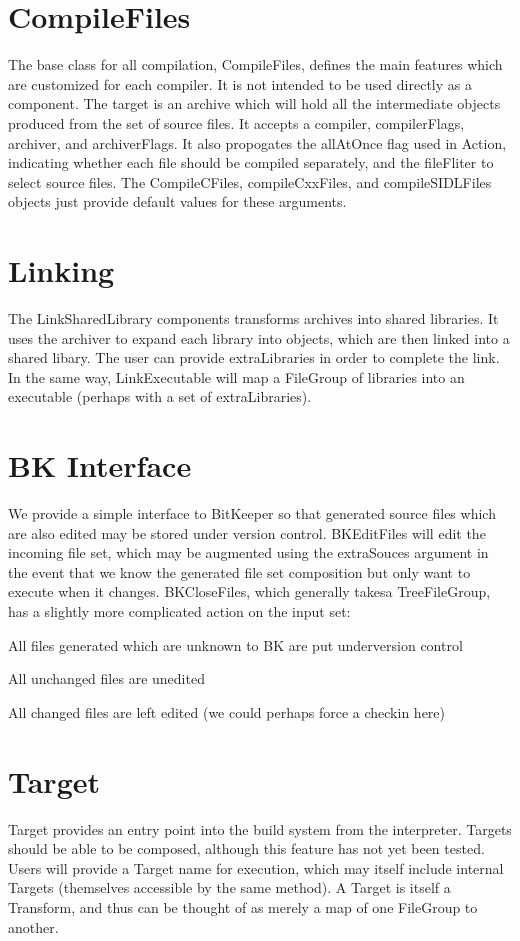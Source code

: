 \section{CompileFiles}

The base class for all compilation, CompileFiles, defines the main features which are customized for each compiler. It
is not intended to be used directly as a component. The target is an archive which will hold all the intermediate
objects produced from the set of source files. It accepts a compiler, compilerFlags, archiver, and archiverFlags. It
also propogates the allAtOnce flag used in Action, indicating whether each file should be compiled separately, and the
fileFliter to select source files. The CompileCFiles, compileCxxFiles, and compileSIDLFiles objects just provide default
values for these arguments.

\section{Linking}

The LinkSharedLibrary components transforms archives into shared libraries. It uses the archiver to expand each library
into objects, which are then linked into a shared libary. The user can provide extraLibraries in order to complete the
link. In the same way, LinkExecutable will map a FileGroup of libraries into an executable (perhaps with a set of
extraLibraries).

\section{BK Interface}

We provide a simple interface to BitKeeper so that generated source files which are also edited may be stored under
version control. BKEditFiles will edit the incoming file set, which may be augmented using the extraSouces argument in
the event that we know the generated file set composition but only want to execute when it changes. BKCloseFiles, which
generally takesa TreeFileGroup, has a slightly more complicated action on the input set:
\begin{\itemize}
  \item All files generated which are unknown to BK are put underversion control
  \item All unchanged files are unedited
  \item All changed files are left edited (we could perhaps force a checkin here)
\end{\itemize}

\section{Target}

Target provides an entry point into the build system from the interpreter. Targets should be able to be composed,
although this feature has not yet been tested. Users will provide a Target name for execution, which may itself include
internal Targets (themselves accessible by the same method). A Target is itself a Transform, and thus can be thought of
as merely a map of one FileGroup to another.
